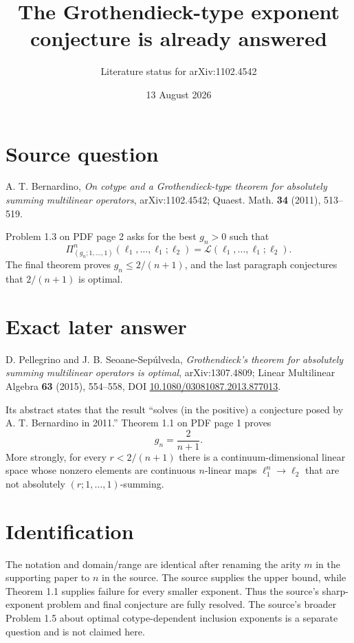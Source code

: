 \documentclass[11pt]{article}
\title{The Grothendieck-type exponent conjecture is already answered}
\author{Literature status for arXiv:1102.4542}
\date{13 August 2026}
\begin{document}
\maketitle

\begin{center}
\end{center}

\section*{Source question}

A. T. Bernardino, \emph{On cotype and a Grothendieck-type theorem for
absolutely summing multilinear operators}, arXiv:1102.4542; Quaest. Math.
\textbf{34} (2011), 513--519.

Problem 1.3 on PDF page 2 asks for the best $g_n>0$ such that
\[
 \Pi^n_{(g_n;1,\ldots,1)}(\ell_1,\ldots,\ell_1;\ell_2)
 =\mathcal L(\ell_1,\ldots,\ell_1;\ell_2).
\]
The final theorem proves $g_n\le 2/(n+1)$, and the last paragraph conjectures
that $2/(n+1)$ is optimal.

\section*{Exact later answer}

D. Pellegrino and J. B. Seoane-Sep\'ulveda,
\emph{Grothendieck's theorem for absolutely summing multilinear operators is
optimal}, arXiv:1307.4809; Linear Multilinear Algebra \textbf{63} (2015),
554--558, DOI \href{https://doi.org/10.1080/03081087.2013.877013}{10.1080/03081087.2013.877013}.

Its abstract states that the result ``solves (in the positive) a conjecture
posed by A. T. Bernardino in 2011.''  Theorem 1.1 on PDF page 1 proves
\[
 \boxed{g_n=\frac{2}{n+1}.}
\]
More strongly, for every $r<2/(n+1)$ there is a continuum-dimensional linear
space whose nonzero elements are continuous $n$-linear maps
$\ell_1^n\to\ell_2$ that are not absolutely $(r;1,\ldots,1)$-summing.

\section*{Identification}

The notation and domain/range are identical after renaming the arity $m$ in
the supporting paper to $n$ in the source.  The source supplies the upper
bound, while Theorem 1.1 supplies failure for every smaller exponent.  Thus
the source's sharp-exponent problem and final conjecture are fully resolved.
The source's broader Problem 1.5 about optimal cotype-dependent inclusion
exponents is a separate question and is not claimed here.
\end{document}
